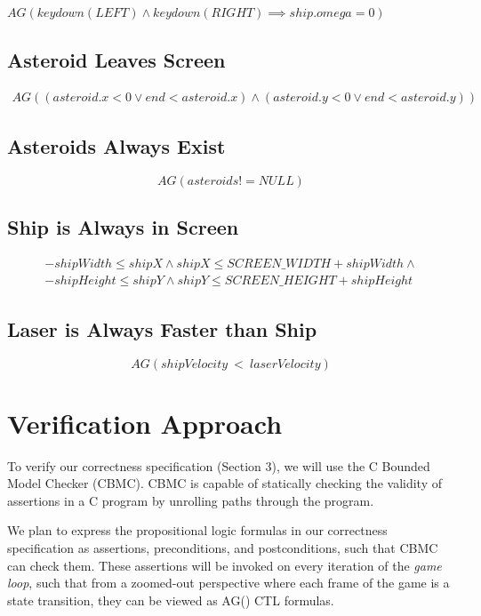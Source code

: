 \documentclass{article}
\begin{document}
        $AG(keydown(LEFT) \land keydown(RIGHT) \implies ship.omega = 0)$
	
	\subsection{Asteroid Leaves Screen}
	
		\begin{align*}
			AG((asteroid.x < 0 \lor end < asteroid.x) \land 
			(asteroid.y < 0 \lor end < asteroid.y))
		\end{align*}
    
    \subsection{Asteroids Always Exist}
    \[AG(asteroids != NULL)\]

    \subsection{Ship is Always in Screen}
    \begin{gather*}
        -shipWidth \leq shipX \land shipX \leq SCREEN\_WIDTH + shipWidth \land \\
        -shipHeight \leq shipY \land shipY \leq SCREEN\_HEIGHT + shipHeight
    \end{gather*}

    \subsection{Laser is Always Faster than Ship}
    $$AG(shipVelocity~<~laserVelocity)$$

\section{Verification Approach}

    To verify our correctness specification (Section 3), we will use the C
    Bounded Model Checker (CBMC). CBMC is capable of statically checking the
    validity of assertions in a C program by unrolling paths through the
    program.

    We plan to express the propositional logic formulas in our correctness
    specification as assertions, preconditions, and postconditions, such that
    CBMC can check them. These assertions will be invoked on every iteration of
    the \textit{game loop}, such that from a zoomed-out perspective where each
    frame of the game is a state transition, they can be viewed as AG() CTL
    formulas.
\end{document}
